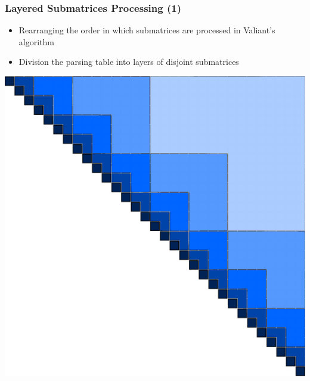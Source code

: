 \documentclass[xcolor=table]{beamer}
\begin{document}
\begin{frame}[fragile] \frametitle{Layered Submatrices Processing (1)}

    \vspace{55}
    \begin{itemize}
    \item Rearranging the order in which \linebreak submatrices are processed in \linebreak Valiant's algorithm
    \item Division the parsing table into \linebreak layers of disjoint submatrices
    \end{itemize}
        
    \vspace{-130}\hspace{165}\includegraphics[width = 0.5\linewidth, right]{pic/layers.pdf}

    
\end{frame}
\end{document}
